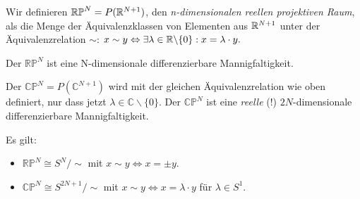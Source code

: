 \begin{defi}
Wir definieren $\mathbb{RP}^N = P(\mathbb R^{N+1})$, den \emph{n-dimensionalen reellen projektiven Raum}, als die Menge der Äquivalenzklassen von Elementen aus $\mathbb R^{N+1}$ unter der Äquivalenzrelation $\sim$: $x \sim y \Leftrightarrow \exists \lambda \in \mathbb R \backslash \{0\}: x = \lambda \cdot y.$
\end{defi}

\begin{satz}
Der $\mathbb{RP}^N$ ist eine N-dimensionale differenzierbare Mannigfaltigkeit.
\end{satz}

\begin{bem}
Der $\mathbb{CP}^N = P(\mathbb{C}^{N+1})$ wird mit der gleichen Äquivalenzrelation wie oben definiert, nur dass jetzt $\lambda \in \mathbb{C} \backslash \{0\}$.
Der $\mathbb{CP}^N$ ist eine \emph{reelle} (!) $2N$-dimensionale differenzierbare Mannigfaltigkeit.
\end{bem}

\begin{bem} Es gilt:
\begin{itemize}
	\item $\mathbb{RP}^N \cong S^N / \sim$ mit $x \sim y \Leftrightarrow x = \pm y$.
	\item $\mathbb{CP}^N \cong S^{2N+1} / \sim$ mit $x \sim y \Leftrightarrow x = \lambda \cdot y$ für $\lambda \in S^1$.
\end{itemize}
\end{bem}